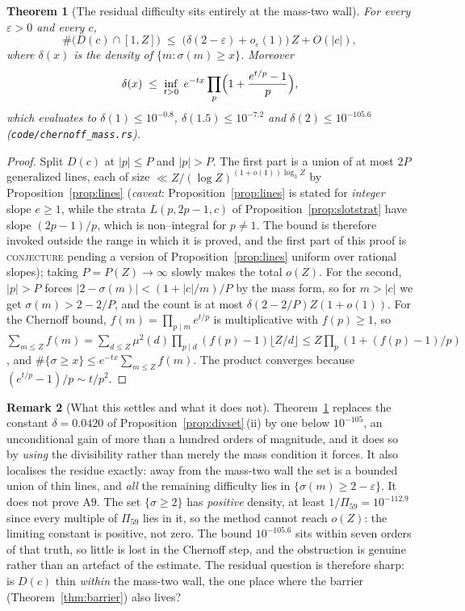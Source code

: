 \documentclass[11pt]{article}
\newtheorem{theorem}{Theorem}[section]
\theoremstyle{definition}
\newtheorem{remark}[theorem]{Remark}
\begin{document}
\begin{theorem}[The residual difficulty sits entirely at the mass-two wall]\label{thm:masstwo}
For every $\varepsilon>0$ and every $c$,
\[ \#\bigl(D(c)\cap[1,Z]\bigr)\;\le\;\bigl(\delta(2-\varepsilon)+o_\varepsilon(1)\bigr)\,Z+O(|c|), \]
where $\delta(x)$ is the density of $\{m:\sigma(m)\ge x\}$. Moreover
\[ \delta(x)\;\le\;\inf_{t>0}\;e^{-tx}\prod_{p}\Bigl(1+\frac{e^{t/p}-1}{p}\Bigr), \]
which evaluates to $\delta(1)\le10^{-0.8}$, $\delta(1.5)\le10^{-7.2}$ and
$\delta(2)\le10^{-105.6}$ \textup{(\texttt{code/chernoff\_mass.rs})}.
\end{theorem}
\begin{proof}
Split $D(c)$ at $|p|\le P$ and $|p|>P$. The first part is a union of at most $2P$ generalized lines,
each of size $\ll Z/(\log Z)^{(1+o(1))\log_3 Z}$ by Proposition~\ref{prop:lines}
\textup{(}\emph{caveat}: Proposition~\ref{prop:lines} is stated for \emph{integer} slope $e\ge1$,
while the strata $L(p,2p-1,c)$ of Proposition~\ref{prop:slotstrat} have slope $(2p-1)/p$, which is
non--integral for $p\ne1$. The bound is therefore invoked outside the range in which it is proved,
and the first part of this proof is \textsc{conjecture} pending a version of
Proposition~\ref{prop:lines} uniform over rational slopes\textup{)}; taking
$P=P(Z)\to\infty$ slowly makes the total $o(Z)$. For the second, $|p|>P$ forces
$|2-\sigma(m)|<(1+|c|/m)/P$ by the mass form, so for $m>|c|$ we get $\sigma(m)>2-2/P$, and the count
is at most $\delta(2-2/P)Z(1+o(1))$. For the Chernoff bound, $f(m)=\prod_{p\mid m}e^{t/p}$ is
multiplicative with $f(p)\ge1$, so
$\sum_{m\le Z}f(m)=\sum_{d\le Z}\mu^2(d)\prod_{p\mid d}(f(p)-1)\lfloor Z/d\rfloor
\le Z\prod_p(1+(f(p)-1)/p)$, and $\#\{\sigma\ge x\}\le e^{-tx}\sum_{m\le Z}f(m)$.
The product converges because $(e^{t/p}-1)/p\sim t/p^2$.
\end{proof}

\begin{remark}[What this settles and what it does not]\label{rem:masstwo}
Theorem~\ref{thm:masstwo} replaces the constant $\delta=0.0420$ of
Proposition~\ref{prop:divset}\,(ii) by one below $10^{-105}$, an unconditional gain of more than a
hundred orders of magnitude, and it does so by \emph{using} the divisibility rather than merely the
mass condition it forces. It also localises the residue exactly: away from the mass-two wall the set
is a bounded union of thin lines, and \emph{all} the remaining difficulty lies in
$\{\sigma(m)\ge2-\varepsilon\}$. It does not prove $\mathrm{A}9$. The set $\{\sigma\ge2\}$ has
\emph{positive} density, at least $1/\Pi_{59}=10^{-112.9}$ since every multiple of $\Pi_{59}$ lies
in it, so the method cannot reach $o(Z)$: the limiting constant is positive, not zero. The bound
$10^{-105.6}$ sits within seven orders of that truth, so little is lost in the Chernoff step, and the
obstruction is genuine rather than an artefact of the estimate. The residual question is therefore
sharp: is $D(c)$ thin \emph{within} the mass-two wall, the one place where the barrier
\textup{(Theorem~\ref{thm:barrier})} also lives?
\end{remark}
\end{document}
